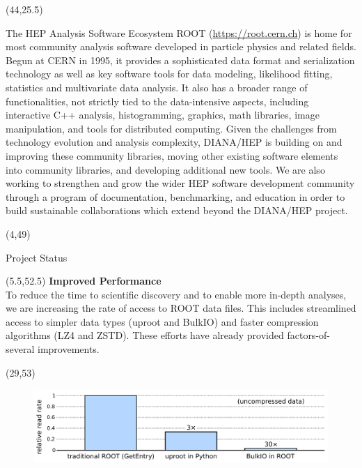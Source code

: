 \documentclass[final]{beamer}
\begin{document}
\begin{frame}{}
\begin{textblock}{38.0}(44,25.5)
\begin{block}{The HEP Analysis Software Ecosystem}
ROOT (\href{https://root.cern.ch}{https://root.cern.ch}) is
home for most community analysis
software developed in particle physics and related fields. Begun at CERN in 1995,
it provides a sophisticated data format and serialization technology
as well as key software tools for
data modeling, likelihood fitting, statistics and
multivariate data analysis. It also has a broader range of
functionalities, not strictly tied to the data-intensive aspects,
including interactive C++ analysis, histogramming,
graphics, math libraries, image manipulation,
and tools for distributed computing.
Given the challenges from technology evolution and analysis complexity,
DIANA/HEP is building on and improving these
community libraries, moving other existing software elements into
community libraries, and developing additional new tools. 
We are also working to strengthen and grow the wider HEP software 
development community through a program of documentation, benchmarking,
and education in order to build sustainable collaborations which 
extend beyond the DIANA/HEP project.
\end{block}
\end{textblock}





\begin{textblock}{78.0}(4,49)
\begin{block}{Project Status}
\end{block}
\end{textblock}

\begin{textblock}{22.5}(5.5,52.5)
\textcolor{mybluelabel}{\bf Improved Performance} \\
To reduce the time to scientific discovery and to enable more in-depth analyses, we are
increasing the rate of access to ROOT data files. This includes streamlined access to simpler
data types (uproot and BulkIO) and faster compression algorithms (LZ4 and ZSTD). These
efforts have already provided factors-of-several improvements.
\end{textblock}

\begin{textblock}{12.5}(29,53)
\begin{figure}[tbph]
\centering
\includegraphics[width=\textwidth]{images/getentry-uproot-bulkio.pdf}


\end{figure}
\end{textblock}
\end{frame}
\end{document}

